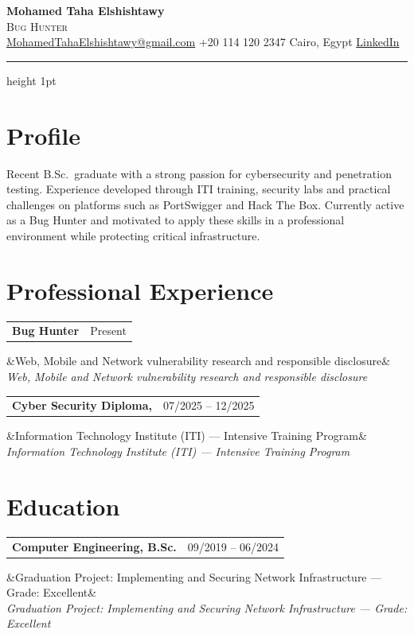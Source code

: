 \documentclass[11pt,a4paper]{article}
\makeatletter
\newcommand{\entry}[3]{%
  \noindent\begin{tabularx}{\linewidth}{@{}X r@{}}
    \textbf{#1} & {\color{muted}#3} \\
  \end{tabularx}%
  \ifx&#2&\else\vspace{1pt}\\[-2pt]{\color{muted}\itshape #2}\fi%
  \par\vspace{4pt}
}
\makeatother
\begin{document}
{\Huge\bfseries Mohamed Taha Elshishtawy}\\[4pt]
{\large\color{accent}\scshape Bug Hunter}\\[6pt]
{\color{muted}%
\href{mailto:MohamedTahaElshishtawy@gmail.com}{MohamedTahaElshishtawy@gmail.com} \quad\textbar\quad
+20 114 120 2347 \quad\textbar\quad
Cairo, Egypt \quad\textbar\quad
\href{https://www.linkedin.com/in/mohamed-elshishtawy-871694194/}{LinkedIn}%
}

\vspace{2pt}
{\color{rule}\hrule height 1pt}
\vspace{2pt}

\section{Profile}
Recent B.Sc.\ graduate with a strong passion for cybersecurity and penetration testing.
Experience developed through ITI training, security labs and practical challenges on
platforms such as PortSwigger and Hack The Box. Currently active as a Bug Hunter and
motivated to apply these skills in a professional environment while protecting critical
infrastructure.

\section{Professional Experience}
\entry{Bug Hunter \normalfont{--- Independent / Freelance}}{Web, Mobile and Network vulnerability research and responsible disclosure}{Present}
\entry{Cyber Security Diploma, \normalfont{Trainee}}{Information Technology Institute (ITI) --- Intensive Training Program}{07/2025 -- 12/2025}

\section{Education}
\entry{Computer Engineering, B.Sc. \normalfont{--- Menoufia University}}{Graduation Project: Implementing and Securing Network Infrastructure --- Grade: Excellent}{09/2019 -- 06/2024}

\end{document}
